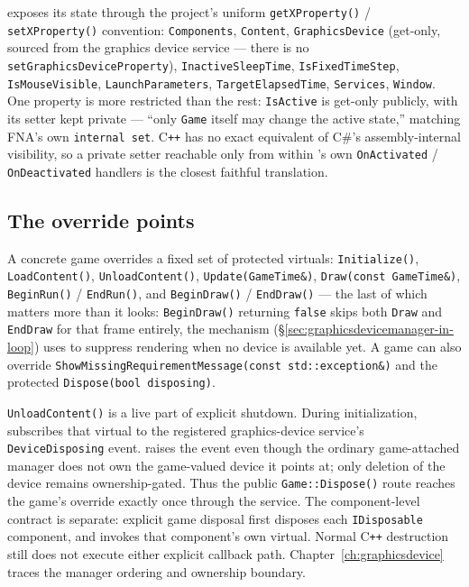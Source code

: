  exposes its state through the project's uniform
\texttt{getXProperty()} / \texttt{setXProperty()} convention: \texttt{Components},
\texttt{Content}, \texttt{GraphicsDevice} (get-only, sourced from the graphics device
service --- there is no \texttt{setGraphicsDeviceProperty}), \texttt{InactiveSleepTime},
\texttt{IsFixedTimeStep}, \texttt{IsMouseVisible}, \texttt{LaunchParameters},
\texttt{TargetElapsedTime}, \texttt{Services}, \texttt{Window}. One property is more
restricted than the rest: \texttt{IsActive} is get-only publicly, with its setter kept
private --- ``only \texttt{Game} itself may change the active state,'' matching FNA's own
\texttt{internal set}. C\texttt{++} has no exact equivalent of C\#'s assembly-internal
visibility, so a private setter reachable only from within 's own
\texttt{OnActivated} / \texttt{OnDeactivated} handlers is the closest faithful translation.

\subsection{The override points}

A concrete game overrides a fixed set of protected virtuals: \texttt{Initialize()},
\texttt{LoadContent()}, \texttt{UnloadContent()}, \texttt{Update(GameTime\&)},
\texttt{Draw(const GameTime\&)}, \texttt{BeginRun()} / \texttt{EndRun()}, and
\texttt{BeginDraw()} / \texttt{EndDraw()} --- the last of which matters more than it looks:
\texttt{BeginDraw()} returning \texttt{false} skips both \texttt{Draw} and \texttt{EndDraw}
for that frame entirely, the mechanism 
(\S\ref{sec:graphicsdevicemanager-in-loop}) uses to suppress rendering when no device is
available yet. A game can also override \texttt{ShowMissingRequirementMessage(const
std::exception\&)} and the protected \texttt{Dispose(bool disposing)}.

\texttt{UnloadContent()} is a live part of explicit shutdown. During initialization,
 subscribes that virtual to the registered graphics-device service's
\texttt{DeviceDisposing} event.  raises the event
even though the ordinary game-attached manager does not own the game-valued device it points at;
only deletion of the device remains ownership-gated. Thus the public
\texttt{Game::Dispose()} route reaches the game's override exactly once through the service.
The component-level contract is separate: explicit game disposal first disposes each
\texttt{IDisposable} component, and  invokes that
component's own virtual. Normal C\texttt{++} destruction still does not execute either explicit
callback path. Chapter~\ref{ch:graphicsdevice} traces the manager ordering and ownership boundary.

